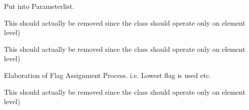 \begin{DoxyRefList}
Put into Parameterlist.  
\item[Class \mbox{\hyperlink{classFEDD_1_1CarreauYasuda}{F\+E\+DD::Carreau\+Yasuda$<$ SC, LO, GO, NO $>$}} ]\label{todo__todo000009}%
%
This should actually be removed since the class should operate only on element level)  
\item[Class \mbox{\hyperlink{classFEDD_1_1DifferentiableFuncClass}{F\+E\+DD::Differentiable\+Func\+Class$<$ SC, LO, GO, NO $>$}} ]\label{todo__todo000014}%
%
This should actually be removed since the class should operate only on element level)  
\item[Member \mbox{\hyperlink{classFEDD_1_1MeshUnstructured_adac83696732ac7e8115cfa43f14779c3}{F\+E\+DD::Mesh\+Unstructured$<$ SC, LO, GO, NO $>$::assign\+Edge\+Flags}} ()]\label{todo__todo000015}%
%
Elaboration of Flag Assignment Process. i.\+e. Lowest flag is used etc. 
\item[Class \mbox{\hyperlink{classFEDD_1_1PowerLaw}{F\+E\+DD::Power\+Law$<$ SC, LO, GO, NO $>$}} ]\label{todo__todo000010}%
%
This should actually be removed since the class should operate only on element level) 
\end{DoxyRefList}